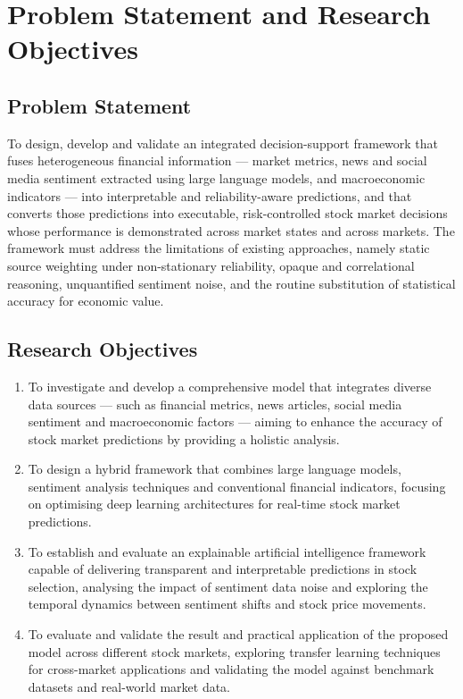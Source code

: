 \chapter{Problem Statement and Research Objectives}

\section{Problem Statement}

To design, develop and validate an integrated decision-support framework that fuses
heterogeneous financial information --- market metrics, news and social media sentiment
extracted using large language models, and macroeconomic indicators --- into interpretable
and reliability-aware predictions, and that converts those predictions into executable,
risk-controlled stock market decisions whose performance is demonstrated across market
states and across markets. The framework must address the limitations of existing
approaches, namely static source weighting under non-stationary reliability, opaque and
correlational reasoning, unquantified sentiment noise, and the routine substitution of
statistical accuracy for economic value.

\section{Research Objectives}

\begin{enumerate}[label=\textbf{RO\arabic*.},leftmargin=2.6em]
\item To investigate and develop a comprehensive model that integrates diverse data sources
--- such as financial metrics, news articles, social media sentiment and macroeconomic
factors --- aiming to enhance the accuracy of stock market predictions by providing a
holistic analysis.

\item To design a hybrid framework that combines large language models, sentiment analysis
techniques and conventional financial indicators, focusing on optimising deep learning
architectures for real-time stock market predictions.

\item To establish and evaluate an explainable artificial intelligence framework capable of
delivering transparent and interpretable predictions in stock selection, analysing the impact
of sentiment data noise and exploring the temporal dynamics between sentiment shifts and
stock price movements.

\item To evaluate and validate the result and practical application of the proposed model
across different stock markets, exploring transfer learning techniques for cross-market
applications and validating the model against benchmark datasets and real-world market data.
\end{enumerate}

